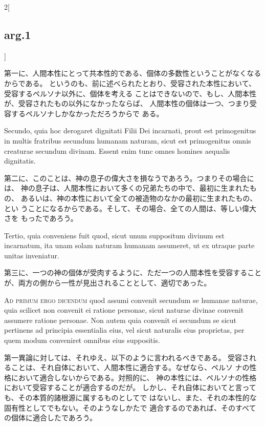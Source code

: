 \documentclass[paper=a4paper,fontsize=10pt,jafontsize=9pt,titlepage]{jlreq}
\begin{document}
\begin{paracol}{2}[\subsection{arg.1}]
\switchcolumn

第一に、人間本性にとって共本性的である、個体の多数性ということがなくなる
 からである。
というのも、前に述べられたとおり、受容された本性において、受容するペルソナ以外に、個体を考える
ことはできないので、もし、人間本性が、受容されたもの以外になかったならば、
 人間本性の個体は一つ、つまり受容するペルソナしかなかっただろうからで
 ある。

\switchcolumn*

Secundo, quia hoc
derogaret dignitati Filii Dei incarnati, prout est primogenitus in
multis fratribus secundum humanam naturam, sicut est primogenitus omnis
creaturae secundum divinam. Essent enim tunc omnes homines aequalis
dignitatis.

\switchcolumn

第二に、このことは、神の息子の偉大さを損なうであろう。つまりその場合には、
 神の息子は、人間本性において多くの兄弟たちの中で、最初に生まれたもの、
 あるいは、神の本性において全ての被造物のなかの最初に生まれたもの、とい
 うことになるからである。そして、その場合、全ての人間は、等しい偉大さを
 もったであろう。

\switchcolumn*

Tertio, quia conveniens fuit quod, sicut unum suppositum
divinum est incarnatum, ita unam solam naturam humanam assumeret, ut ex
utraque parte unitas inveniatur.

\switchcolumn

第三に、一つの神の個体が受肉するように、ただ一つの人間本性を受容すること
 が、両方の側から一性が見出されることとして、適切であった。

\switchcolumn*[\subsection{ad.1}]

{\scshape Ad primum ergo dicendum} quod assumi convenit secundum se humanae
naturae, quia scilicet non convenit ei ratione personae, sicut naturae
divinae convenit assumere ratione personae. Non autem quia convenit ei
secundum se sicut pertinens ad principia essentialia eius, vel sicut
naturalis eius proprietas, per quem modum conveniret omnibus eius
suppositis.

\switchcolumn

第一異論に対しては、それゆえ、以下のように言われるべきである。
受容されることは、それ自体において、人間本性に適合する。なぜなら、ペルソ
 ナの性格において適合しないからである。対照的に、
神の本性には、ペルソナの性格において受容することが適合するのだが。
しかし、それ自体においてと言っても、その本質的諸根源に属するものとしてで
 はないし、また、それの本性的な固有性としてでもない。そのようなしかたで
 適合するのであれば、そのすべての個体に適合したであろう。


\end{paracol}
\end{document}
